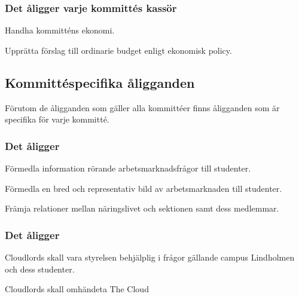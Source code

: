 \subsubsection{Det åligger varje kommittés kassör}
\begin{att}
	\item Handha kommitténs ekonomi.
	\item Upprätta förslag till ordinarie budget enligt ekonomisk policy.
\end{att}

\subsection{Kommittéspecifika åligganden}
Förutom de åligganden som gäller alla kommittéer finns åligganden som är specifika för varje kommitté.

\subsubsection{Det åligger \ARMIT{}}
\begin{att}
	\item Förmedla information rörande arbetsmarknadsfrågor till studenter.
	\item Förmedla en bred och representativ bild av arbetsmarknaden till studenter.
	\item Främja relationer mellan näringslivet och sektionen samt dess medlemmar.
\end{att}

\subsubsection{Det åligger \CLOUDLORDS}
\begin{att}
	\item Cloudlords skall vara styrelsen behjälplig i frågor gällande campus Lindholmen och dess studenter.
    \item Cloudlords skall omhändeta The Cloud
\end{att}

